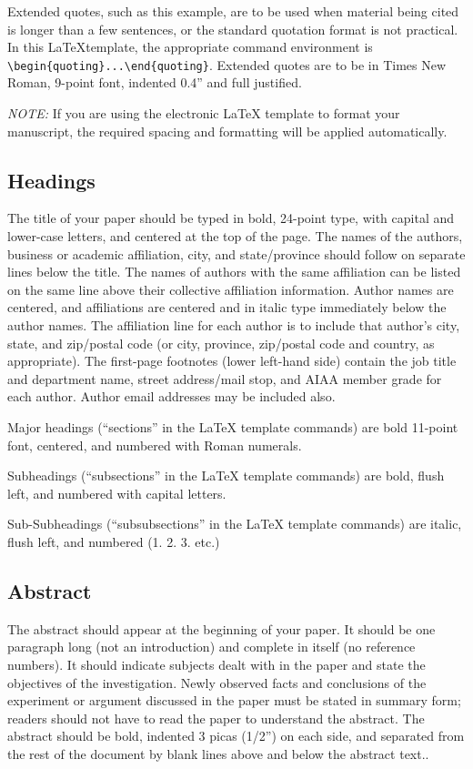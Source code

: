 \documentclass[conf]{new-aiaa}
\begin{document}
\begin{quoting}
Extended quotes, such as this example, are to be used when material being cited is longer than a few sentences, or the standard quotation format is not practical. In this \LaTeX template, the appropriate command environment is \verb|\begin{quoting}...\end{quoting}|. Extended quotes are to be in Times New Roman, 9-point font, indented 0.4'' and full justified.
\end{quoting}

\emph{NOTE:} If you are using the electronic \LaTeX{} template to format your manuscript, the required spacing and formatting will be applied automatically.

\subsection{Headings}
The title of your paper should be typed in bold, 24-point type, with capital and lower-case letters, and centered at the top of the page. The names of the authors, business or academic affiliation, city, and state/province should follow on separate lines below the title. The names of authors with the same affiliation can be listed on the same line above their collective affiliation information. Author names are centered, and affiliations are centered and in italic type immediately below the author names. The affiliation line for each author is to include that author’s city, state, and zip/postal code (or city, province, zip/postal code and country, as appropriate). The first-page footnotes (lower left-hand side) contain the job title and department name, street address/mail stop, and AIAA member grade for each author. Author email addresses may be included also.

Major headings (``sections'' in the \LaTeX{} template commands) are bold 11-point font, centered, and numbered with Roman numerals.

Subheadings (``subsections'' in the \LaTeX{} template commands) are bold, flush left, and numbered with capital letters. 

Sub-Subheadings (``subsubsections'' in the \LaTeX{} template commands) are italic, flush left, and numbered (1. 2. 3. etc.)


\subsection{Abstract}
The abstract should appear at the beginning of your paper. It should be one paragraph long (not an introduction) and complete in itself (no reference numbers). It should indicate subjects dealt with in the paper and state the objectives of the investigation. Newly observed facts and conclusions of the experiment or argument discussed in the paper must be stated in summary form; readers should not have to read the paper to understand the abstract. The abstract should be bold, indented 3 picas (1/2'') on each side, and separated from the rest of the document by blank lines above and below the abstract text..
\end{document}
